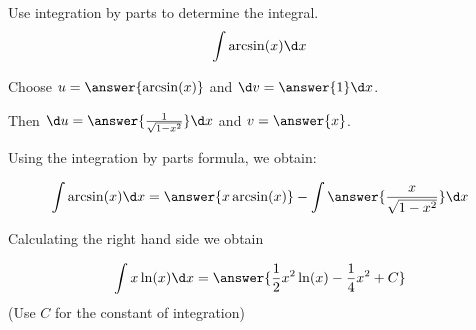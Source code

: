 \documentclass{ximera}
\author{Jason Miller}
\begin{document}
\begin{exercise}
Use integration by parts to determine the integral.
\[
\int \arcsin(x) \d x 
\]


Choose $u=\answer{ \arcsin(x) }$ and $\d v=\answer{1 }\d x$. 

Then $\d u= \answer{ \frac{1}{\sqrt{1-x^{2}}} } \d x$ and $v= \answer{x}$.

Using the integration by parts formula, we obtain:

\[
\int \arcsin(x) \d x= \answer{x\arcsin(x)} - \int \answer{ \frac{x}{\sqrt{1-x^{2}}} } \d x
\]

Calculating the right hand side we obtain

\[
\int x \ln(x) \d x= \answer{ \frac{1}{2} x^2 \ln(x) - \frac{1}{4}x^2    +C} 
\]
(Use $C$ for the constant of integration)

\end{exercise}
\end{document}
